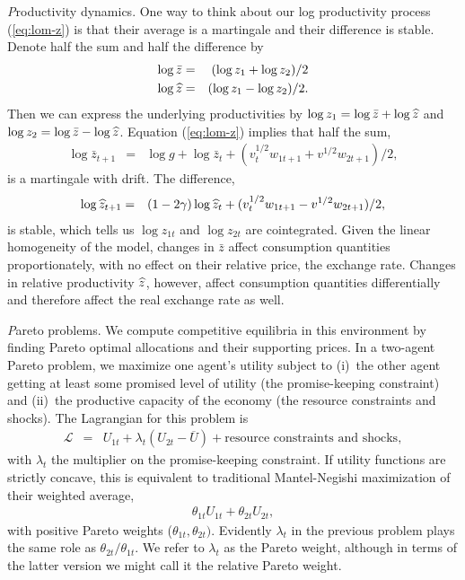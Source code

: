 {\textit Productivity dynamics.\/}
One way to think about our log productivity process (\ref{eq:lom-z})
is that their average is a martingale and their difference is stable.
Denote half the sum and half the difference by
\begin{eqnarray*}
    \log \bar{z} &=& (\log z_1 + \log z_2)/2 \\
    \log \widehat{z}  &=& (\log z_1 - \log z_2)/2  .
\end{eqnarray*}
Then we can express the underlying productivities
by $\log z_1 = \log \bar{z} + \log \widehat{z}$ and $\log z_2 = \log \bar{z} - \log \widehat{z} $.
Equation (\ref{eq:lom-z}) implies that half the sum,
\begin{eqnarray*}
    \log \bar{z}_{t+1} &=& \log g + \log \bar{z}_t + (v_t^{1/2} w_{1t+1} + v^{1/2} w_{2t+1})/2 ,
\end{eqnarray*}
is a martingale with drift.
The difference,
\begin{eqnarray}
    \log \widehat{z}_{t+1}  &=& (1-2\gamma) \log \widehat{z}_t + (v_t^{1/2} w_{1t+1} - v^{1/2} w_{2t+1})/2 ,
    \label{eq:lom-zhat}
\end{eqnarray}
is stable, which tells us $\log z_{1t}$ and $\log z_{2t}$ are cointegrated.
Given the linear homogeneity of the model, changes in $\bar{z}$ affect consumption
quantities proportionately, with no effect on their relative price, the exchange rate.
Changes in relative productivity $\widehat{z}$, however,
affect consumption quantities differentially and therefore affect the real exchange rate
as well.

{\textit Pareto problems.\/}
We compute competitive equilibria in this environment by finding
Pareto optimal allocations and their supporting prices.
 In a two-agent Pareto problem,
we maximize one agent's utility subject to
(i)~the other agent getting at least some promised level of utility
(the promise-keeping constraint)
and (ii)~the productive capacity of the economy (the resource constraints and shocks).
The Lagrangian for this problem is
\begin{eqnarray*}
 \mathcal{L} &=& U_{1t} + \lambda_{t} (U_{2t} - \overline{U}) + \mbox{resource constraints and shocks} ,
\end{eqnarray*}
with $\lambda_t$ the multiplier on the promise-keeping constraint.
If utility functions are strictly concave,
this is equivalent to traditional Mantel-Negishi maximization of their weighted average,
\begin{eqnarray*}
    \theta_{1t} U_{1t} + \theta_{2t} U_{2t} ,
\end{eqnarray*}
with positive Pareto weights ($\theta_{1t}, \theta_{2t})$.
Evidently $\lambda_t$ in the previous problem plays the same role as $ \theta_{2t}/\theta_{1t}$.
We refer to $\lambda_t$ as the Pareto weight,
although in terms of the latter version we might call it the relative Pareto weight.


